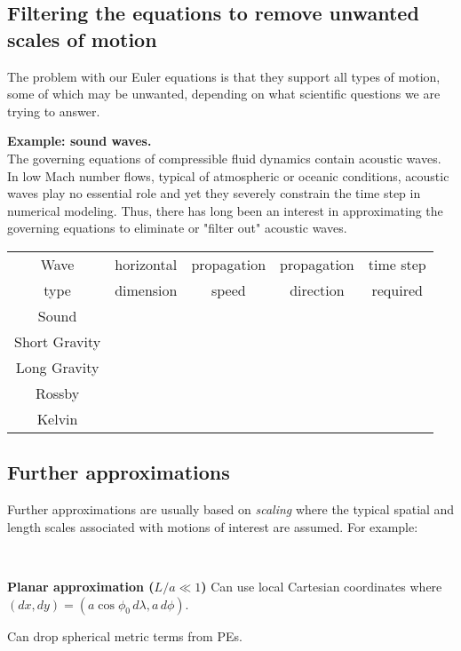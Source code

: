 \subsection{Filtering the equations to remove unwanted scales of motion} 

The problem with our Euler equations is that they support all types of motion, some of which may be unwanted, depending on what scientific questions we are trying to answer. 

\medskip

{\bf Example: sound waves.}\\
The governing equations of compressible fluid dynamics contain acoustic waves. In low Mach number flows, typical of atmospheric or oceanic conditions, acoustic waves play no essential role and yet they severely constrain the time step in numerical modeling. Thus, there has long been an interest in approximating the governing equations to eliminate or "filter out" acoustic waves. 

\medskip

\begin{tabular}{|c|c|c|c|c|}
	\hline
	Wave & horizontal & propagation & propagation  & time step \\
	type & dimension & speed & direction & required \\
	\hline
	Sound &  &  &  & \\
	\hline
	Short Gravity &  &  &  & \\
	\hline
	Long Gravity &  &  &  & \\
	\hline
	Rossby &  &  & & \\
	\hline
	Kelvin &  &  &  & \\
	\hline
\end{tabular}


\subsection{Further approximations} 

Further approximations are usually based on {\em scaling} where
the typical spatial and length scales associated with motions of
interest are assumed. For example:

~

{\bf Planar approximation ($L/a \ll 1$)} Can use local Cartesian coordinates where $(dx,dy)=(a \cos\phi_0
\,d\lambda, a\,d\phi)$. 

Can drop spherical metric terms from PEs.

~

